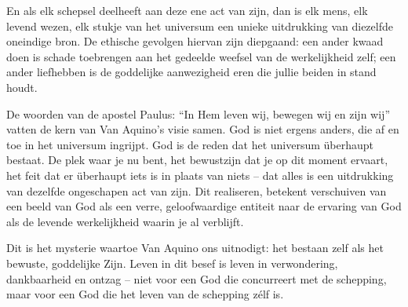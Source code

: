 En als elk schepsel deelheeft aan deze ene act van zijn, dan is elk mens, elk levend wezen, elk stukje van het universum een unieke uitdrukking van diezelfde oneindige bron. De ethische gevolgen hiervan zijn diepgaand: een ander kwaad doen is schade toebrengen aan het gedeelde weefsel van de werkelijkheid zelf; een ander liefhebben is de goddelijke aanwezigheid eren die jullie beiden in stand houdt.

De woorden van de apostel Paulus: “In Hem leven wij, bewegen wij en zijn wij” vatten de kern van Van Aquino’s visie samen. God is niet ergens anders, die af en toe in het universum ingrijpt. God is de reden dat het universum überhaupt bestaat. De plek waar je nu bent, het bewustzijn dat je op dit moment ervaart, het feit dat er überhaupt iets is in plaats van niets – dat alles is een uitdrukking van dezelfde ongeschapen act van zijn. Dit realiseren, betekent verschuiven van een beeld van God als een verre, geloofwaardige entiteit naar de ervaring van God als de levende werkelijkheid waarin je al verblijft.

Dit is het mysterie waartoe Van Aquino ons uitnodigt: het bestaan zelf als het bewuste, goddelijke Zijn. Leven in dit besef is leven in verwondering, dankbaarheid en ontzag – niet voor een God die concurreert met de schepping, maar voor een God die het leven van de schepping zélf is.

